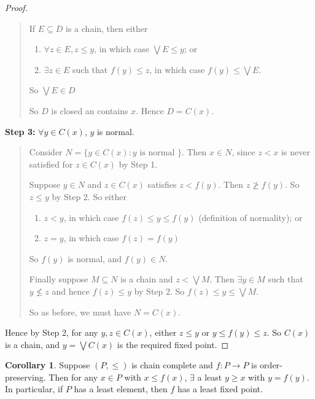 \documentclass[a4paper]{article}
\theoremstyle{definition}
\newtheorem*{cor}{Corollary}
\begin{document}
\begin{proof}
\begin{quote}
    If $E\subseteq D$ is a chain, then either
    \begin{enumerate}
    \item $\forall z\in E, z\leq y$, in which case $\bigvee E\leq y$; or
    \item $\exists z\in E$ such that $f(y)\leq z$, in which case $f(y) \leq \bigvee E$.
    \end{enumerate}
    So $\bigvee E\in D$

    So $D$ is closed an contains $x$. Hence $D = C(x)$.
\end{quote}
\noindent\textbf{Step 3:} $\forall y\in C(x)$, $y$ is normal.
\begin{quote}
  Consider $N = \{y\in C(x): y\text{ is normal }\}$. Then $x\in N$, since $z < x$ is never satisfied for $z\in C(x)$ by Step 1.

  Suppose $y\in N$ and $z\in C(x)$ satisfies $z < f(y)$. Then $z\not\geq f(y)$. So $z\leq y$ by Step 2. So either
  \begin{enumerate}
  \item $z < y$, in which case $f(z) \leq y \leq f(y)$ (definition of normality); or
  \item $z = y$, in which case $f(z) = f(y)$
  \end{enumerate}
  So $f(y)$ is normal, and $f(y)\in N$.

  Finally suppose $M\subseteq N$ is a chain and $z < \bigvee M$. Then $\exists y\in M$ such that $y\not\leq z$ and hence $f(z) \leq y$ by Step 2. So $f(z) \leq y \leq \bigvee M$.

  So as before, we must have $N = C(x)$. 
\end{quote}
Hence by Step 2, for any $y, z\in C(x)$, either $z \leq y$ or $y \leq f(y) \leq z$. So $C(x)$ is a chain, and $y = \bigvee C(x)$ is the required fixed point.
\end{proof}

\begin{cor}
  Suppose $(P, \leq)$ is chain complete and $f: P\to P$ is order-preserving. Then for any $x\in P$ with $x\leq f(x)$, $\exists$ a least $y\geq x$ with $y = f(y)$. In particular, if $P$ has a least element, then $f$ has a least fixed point.
\end{cor}
\end{document}
